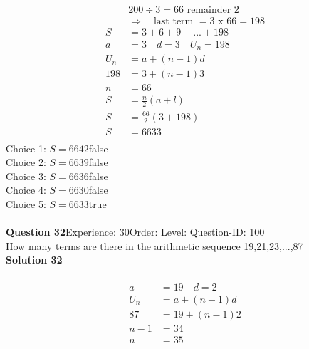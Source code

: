 \documentclass{article}
\begin{document}
\\[-35pt]\begin{align*}
&200 \div 3 = 66 \,\, \text{remainder}\,\, 2\\[2pt]
&\Rightarrow \quad \text{last term }= 3 \,\,\text{x}\,\, 66=198\\[2pt]
S&=3+6+9+...+198\\[12pt]
a&=3\quad d=3 \quad U_n=198\\[2pt]
U_n&=a+(n-1)d\\[2pt]
198&=3+(n-1)3\\[2pt]
n&=66\\[12pt]
S&=\displaystyle\frac{n}{2}(a+l)\\[2pt]
S&=\displaystyle\frac{66}{2}(3+198)\\[2pt]
S&=6633\\
\end{align*}
Choice 1: \hspace{20pt}$S=6642$\hspace{20pt}false\\
Choice 2: \hspace{20pt}$S=6639$\hspace{20pt}false\\
Choice 3: \hspace{20pt}$S=6636$\hspace{20pt}false\\
Choice 4: \hspace{20pt}$S=6630$\hspace{20pt}false\\
Choice 5: \hspace{20pt}$S=6633$\hspace{20pt}true\\
\\[4pt]
\noindent\textbf{Question 32}\hspace{20pt}Experience: 30\hspace{20pt}Order: \hspace{20pt}Level: \hspace{20pt}Question-ID: 100\\[2pt]
How many terms are there in the arithmetic sequence 19,21,23,...,87\\[4pt]
\noindent\textbf{Solution 32}\\[2pt]
\\[-35pt]\begin{align*}
a&=19 \quad d=2\\[2pt]
U_n&=a+(n-1)d\\[2pt]
87&=19+(n-1)2\\[2pt]
n-1&=34\\[2pt]
n&=35
\end{align*}
\end{document}
